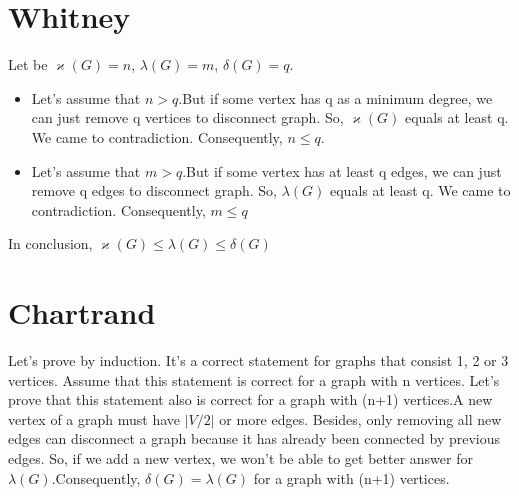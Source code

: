 \documentclass[12pt, letterpaper]{article}
\begin{document}
\section{Whitney}
Let be \begin{math}\varkappa(G) = n\end{math},
\begin{math}\lambda(G) = m \end{math},
\begin{math}\delta(G) = q \end{math}.
\begin{itemize}
  \item Let's assume that \begin{math} n > q \end{math}.\newline But if some vertex has q as a minimum degree, we can just remove q vertices to disconnect graph. So, \begin{math}\varkappa(G)\end{math} equals at least q. We came to contradiction. Consequently, \begin{math} n \leq q \end{math}.
  \item Let's assume that \begin{math} m > q \end{math}.\newline But if some vertex has at least q edges, we can just remove q edges to disconnect graph. So, \begin{math}\lambda(G)\end{math} equals at least q. We came to contradiction. Consequently, \begin{math} m \leq q \end{math}
\end{itemize}
In conclusion, \begin{math} \varkappa(G) \leq \lambda(G) \leq \delta(G)\end{math}

\section{Chartrand}
Let's prove by induction. It's a correct statement for graphs that consist 1, 2 or 3 vertices. Assume that this statement is correct for a graph with n vertices. Let's prove that this statement also is correct for a graph with (n+1) vertices.\newline A new vertex of a graph must have \begin{math}|V/2|\end{math} or more edges. Besides, only removing all new edges can disconnect a graph because it has already been connected by previous edges. So, if we add a new vertex, we won't be able to get better answer for \begin{math}\lambda(G)\end{math}.Consequently,  \begin{math}\delta(G) = \lambda(G) \end{math} for a graph with (n+1) vertices.
\end{document}
